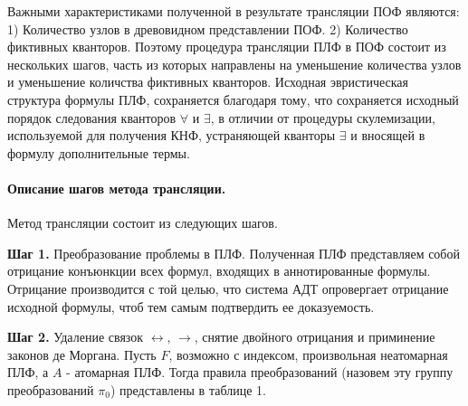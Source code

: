 \documentclass[a4paper]{jctart15b}
\begin{document}



Важными характеристиками полученной в результате трансляции ПОФ являются: 1) Количество узлов в древовидном представлении ПОФ. 2) Количество фиктивных кванторов. Поэтому процедура трансляции ПЛФ в ПОФ состоит из нескольких шагов, часть из которых направлены на уменьшение количества узлов и уменьшение количства фиктивных кванторов. Исходная эвристическая структура формулы ПЛФ, сохраняется благодаря тому, что сохраняется исходный порядок следования кванторов $\forall$ и $\exists$, в отличии от процедуры скулемизации, используемой для получения КНФ, устраняющей кванторы $\exists$ и вносящей в формулу дополнительные термы.

\paragraph{Описание шагов метода трансляции.}

Метод трансляции состоит из следующих шагов.

\textbf{Шаг 1.} Преобразование проблемы в ПЛФ. Полученная ПЛФ представляем собой отрицание конъюнкции всех формул, входящих в аннотированные формулы. Отрицание производится с той целью, что система АДТ опровергает отрицание исходной формулы, чтоб тем самым подтвердить ее доказуемость. %

\textbf{Шаг 2.} Удаление связок $\leftrightarrow$, $\rightarrow$, снятие двойного отрицания и приминение законов де Моргана. Пусть $F$, возможно с индексом, произвольная неатомарная ПЛФ, а $A$ - атомарная ПЛФ. Тогда правила преобразований (назовем эту группу преобразований $\pi_0$) представлены в таблице 1.
\end{document}
